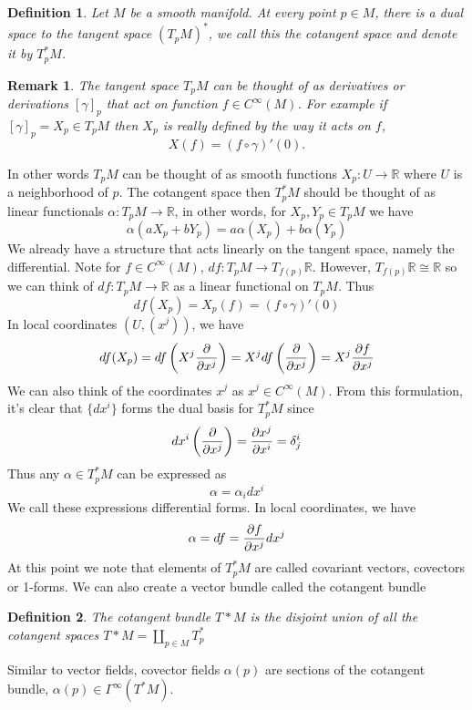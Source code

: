 \documentclass[a4paper]{article}
\newtheorem*{defn}{Definition}
\newtheorem*{rem}{Remark}
\begin{document}
\begin{defn}
  Let $M$ be a smooth manifold. At every point $p \in M$, there is a dual space to the tangent space $(T_pM)^*$, we call this the cotangent space and denote it by $T_p^*M$.
\end{defn}

\begin{rem}
  The tangent space $T_pM$ can be thought of as derivatives or derivations $[\gamma]_p$ that act on function $f \in C^{\infty}(M)$. For example if $[\gamma]_p = X_p \in T_pM$ then $X_p$ is really defined by the way it acts on $f$, 
  \[
    X(f) = (f \circ \gamma)'(0).
  \]
\end{rem}
  In other words $T_pM$ can be thought of as smooth functions $X_p: U \rightarrow \mathds{R}$ where $U$ is a neighborhood of $p$. The cotangent space then $T_p^*M$ should be thought of as linear functionals $\alpha: T_pM \rightarrow \mathds{R}$, in other words, for $X_p,Y_p \in T_pM$ we have
  \[
    \alpha(a X_p + b Y_p) = a \alpha(X_p) + b \alpha(Y_p) 
  \]
  We already have a structure that acts linearly on the tangent space, namely the differential. Note for  $f \in C^{\infty}(M)$, $df: T_pM \rightarrow T_{f(p)}\mathds{R}$. However, $T_{f(p)}\mathds{R} \cong \mathds{R}$ so we can think of $df: T_pM \rightarrow \mathds{R}$ as a linear functional on $T_pM$. Thus 
  \[
    df(X_p) = X_p(f) = (f \circ \gamma)'(0)
  \]
  In local coordinates $(U, (x^j))$, we have
  \[
    df(X_p) = df \left(X^j \pdv{x^j} \right) = X^j df \left( \pdv{x^j} \right) = X^j \pdv{f}{x^j}
  \]
  We can also think of the coordinates $x^j$ as $x^j \in C^{\infty}(M)$. From this formulation, it's clear that $\{dx^i\}$ forms the dual basis for $T^*_pM$ since
  \[
    dx^i \left( \pdv{x^j} \right) = \pdv{x^j}{x^i} = \delta^i_j
  \]
  Thus any $\alpha \in T_p^*M$ can be expressed as 
  \[
    \alpha = \alpha_i dx^i
  \]
  We call these expressions differential forms. In local coordinates, we have
  \[
    \alpha = df = \pdv{f}{x^j} dx^j
  \]
  At this point we note that elements of $T_p^*M$ are called covariant vectors, covectors or 1-forms. We can also create a vector bundle called the cotangent bundle
   \begin{defn}
     The cotangent bundle $T*M$ is the disjoint union of all the cotangent spaces $T*M = \coprod_{p \in M} T^*_p$
   \end{defn}
  
  Similar to vector fields, covector fields $\alpha(p)$ are sections of the cotangent bundle, $\alpha(p) \in \Gamma^{\infty}(T^*M)$.
\end{document}
